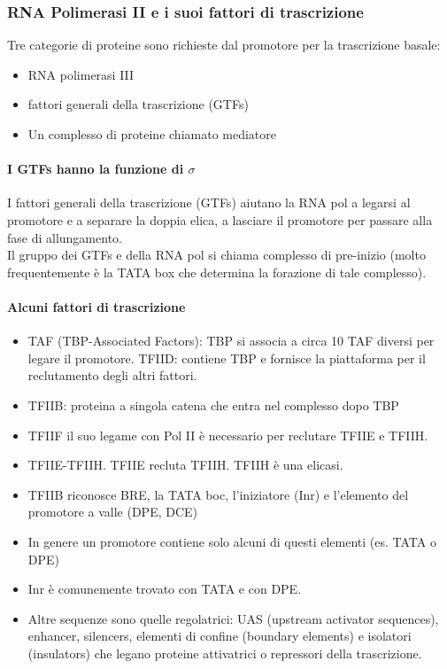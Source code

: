 \documentclass{article}
\begin{document}
\subsubsection{RNA Polimerasi II e i suoi fattori di trascrizione}
Tre categorie di proteine sono richieste dal promotore per la trascrizione basale:
\begin{itemize}
    \item RNA polimerasi III
    \item fattori generali della trascrizione (GTFs)
    \item Un complesso di proteine chiamato mediatore
\end{itemize}
\paragraph{I GTFs hanno la funzione di $\sigma$} I fattori generali della trascrizione (GTFs) aiutano la RNA pol a legarsi al promotore e a separare la doppia elica, a lasciare il promotore per passare alla fase di allungamento.\\
Il gruppo dei GTFs e della RNA pol si chiama complesso di pre-inizio (molto frequentemente è la TATA box che determina la forazione di tale complesso).\\
\paragraph{Alcuni fattori di trascrizione}
\begin{itemize}
    \item TAF (TBP-Associated Factors): TBP si associa a circa 10 TAF diversi per legare il promotore. TFIID: contiene TBP e fornisce la piattaforma per il reclutamento degli altri fattori.
    \item TFIIB: proteina a singola catena che entra nel complesso dopo TBP
    \item TFIIF il suo legame con Pol II è necessario per reclutare TFIIE e TFIIH.
    \item TFIIE-TFIIH. TFIIE recluta TFIIH. TFIIH è una elicasi.
    \item TFIIB riconosce BRE, la TATA boc, l'iniziatore (Inr) e l'elemento del promotore a valle (DPE, DCE)
    \item In genere un promotore contiene solo alcuni di questi elementi (es. TATA o DPE)
    \item Inr è comunemente trovato con TATA e con DPE.
    \item Altre sequenze sono quelle regolatrici: UAS (upstream activator sequences), enhancer, silencers, elementi di confine (boundary elements) e isolatori (insulators) che legano proteine attivatrici o repressori della trascrizione.
\end{itemize}
\end{document}
